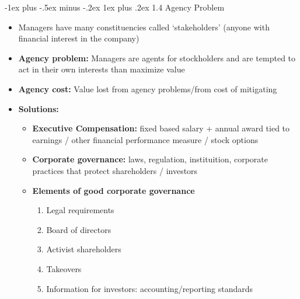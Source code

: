 \documentclass[10pt,landscape]{article}
\makeatletter
\newcommand{\subsubsubsection}{\@startsection{subsubsection}{3}{0mm}%
                                {-1ex plus -.5ex minus -.2ex}%
                                {1ex plus .2ex}%
                                {\normalfont\scriptsize\bfseries}}
\makeatother
\begin{document}
\begin{multicols*}{3}
\subsubsubsection{1.4 Agency Problem}
\begin{itemize}[topsep=0pt,noitemsep,wide=0pt, leftmargin=\dimexpr{} + 2\relax]
    \item Managers have many constituencies called `stakeholders' (anyone with financial interest in the company)
    \item \textbf{Agency problem:} Managers are agents for stockholders and are tempted to act in their own interests than maximize value
    \item \textbf{Agency cost:} Value lost from agency problems/from cost of mitigating 
    \item \textbf{Solutions:}
    \begin{itemize}[topsep=0pt,noitemsep,wide=0pt, leftmargin=\dimexpr{} + 2\relax]
        \item \textbf{Executive Compensation:} fixed based salary + annual award tied to earnings / other financial performance measure / stock options
        \item \textbf{Corporate governance:} laws, regulation, instituition, corporate practices that protect shareholders / investors
        \item \textbf{Elements of good corporate governance}
        \begin{multicols*}{2}
            \begin{enumerate}[topsep=0pt,noitemsep,wide=0pt, leftmargin=\dimexpr\labelwidth + 2\labelsep\relax]
                \item Legal requirements
                \item Board of directors
                \item Activist shareholders
                \item Takeovers
                \item Information for investors: accounting/reporting standards
            \end{enumerate}
        \end{multicols*}
    \end{itemize}
\end{itemize}


\end{multicols*}
\end{document}
